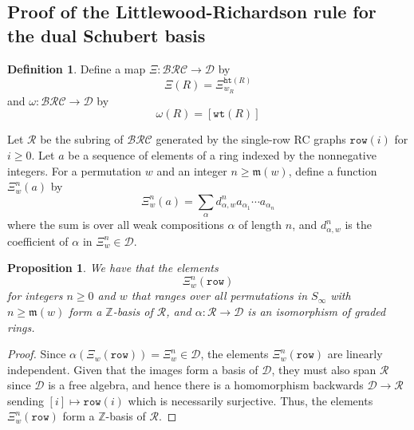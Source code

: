 \documentclass{amsart}
\newtheorem{proposition}[lemma]{Proposition}
\theoremstyle{definition}
\newtheorem{definition}[lemma]{Definition}
\theoremstyle{remark}
\numberwithin{equation}{subsection}
\newcommand{\wof}[1]{w_{#1}}
\newcommand{\wtt}{\mathtt{wt}}
\newcommand{\hr}{\mathtt{ht}}
\newcommand{\BRC}{\mathcal{BRC}}
\newcommand{\dsch}{\ensuremath{\Xi}}
\newcommand{\dcoma}{\mathcal{D}}
\newcommand{\maxd}{\mathfrak{m}}
\begin{document}
\subsection{Proof of the Littlewood-Richardson rule for the dual Schubert basis}


\begin{definition}
Define a map $\Xi:\BRC\to \dcoma$ by
$$\Xi(R) = \dsch_{\wof{R}}^{\hr(R)}$$
and $\omega:\BRC\to\dcoma$ by
$$\omega(R) = [\wtt(R)]$$

Let $\mathcal{R}$  be the subring of $\BRC$ generated by the single-row RC graphs $\mathtt{row}(i)$ for $i\geq 0$. Let $a$ be a sequence of elements of a ring indexed by the nonnegative integers. For a permutation $w$ and an integer $n\geq \maxd(w)$, define a function $\dsch_w^n(a)$ by
$$\dsch_w^n(a) = \sum_{\alpha} d_{\alpha, w}^n a_{\alpha_1} \cdots a_{\alpha_n}$$
where the sum is over all weak compositions $\alpha$ of length $n$, and $d_{\alpha, w}^n$ is the coefficient of $\alpha$ in $\dsch_w^n\in\dcoma$.
\end{definition}

\begin{proposition}
We have that the elements
$$\dsch_w^n(\mathtt{row})$$
for integers $n\geq 0$ and $w$ that ranges over all permutations in $S_\infty$ with $n\geq \maxd(w)$ form a $\mathbb{Z}$-basis of $\mathcal{R}$, and $\alpha:\mathcal{R}\to \dcoma$ is an isomorphism of graded rings.
\end{proposition}
\begin{proof}
Since $\alpha(\dsch_w(\mathtt{row})) = \dsch_w^n\in \dcoma$, the elements $\dsch_w^n(\mathtt{row})$ are linearly independent. Given that the images form a basis of $\dcoma$, they must also span $\mathcal{R}$ since $\dcoma$ is a free algebra, and hence there is a homomorphism backwards $\dcoma\to \mathcal{R}$ sending $[i]\mapsto \mathtt{row}(i)$ which is necessarily surjective. Thus, the elements $\dsch_w^n(\mathtt{row})$ form a $\mathbb{Z}$-basis of $\mathcal{R}$.
\end{proof}
\end{document}
